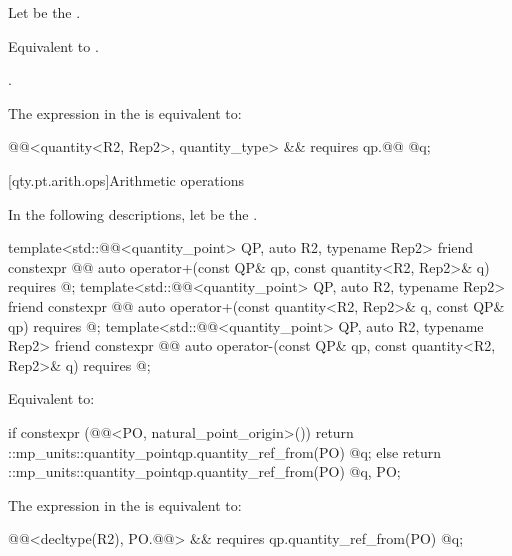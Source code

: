 \begin{itemdescr}
\pnum
Let  be the .

\pnum
\effects
Equivalent to
.

\pnum
\returns
{}.

\pnum
\remarks
The expression in the  is equivalent to:
\begin{codeblock}
@@<quantity<R2, Rep2>, quantity_type> &&
  requires { qp.@@ @\atsign@ q; }
\end{codeblock}
\end{itemdescr}

[qty.pt.arith.ops]{Arithmetic operations}

\pnum
In the following descriptions,
let  be the .

\begin{itemdecl}
template<std::@@<quantity_point> QP, auto R2, typename Rep2>
friend constexpr @@ auto operator+(const QP& qp, const quantity<R2, Rep2>& q)
  requires @\seebelownc@;
template<std::@@<quantity_point> QP, auto R2, typename Rep2>
friend constexpr @@ auto operator+(const quantity<R2, Rep2>& q, const QP& qp)
  requires @\seebelownc@;
template<std::@@<quantity_point> QP, auto R2, typename Rep2>
friend constexpr @@ auto operator-(const QP& qp, const quantity<R2, Rep2>& q)
  requires @\seebelownc@;
\end{itemdecl}

\begin{itemdescr}
\pnum
\effects
Equivalent to:
\begin{codeblock}
if constexpr (@@<PO, natural_point_origin>())
  return ::mp_units::quantity_point{qp.quantity_ref_from(PO) @\atsign@ q};
else
  return ::mp_units::quantity_point{qp.quantity_ref_from(PO) @\atsign@ q, PO};
\end{codeblock}

\pnum
\remarks
The expression in the  is equivalent to:
\begin{codeblock}
@@<decltype(R2), PO.@@> && requires {
  qp.quantity_ref_from(PO) @\atsign@ q;
}
\end{codeblock}
\end{itemdescr}

